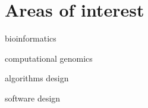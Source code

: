 \section{Areas of interest}
\begin{innerlist}
\item bioinformatics
\item computational genomics
\item algorithms design
\item software design
\end{innerlist}
